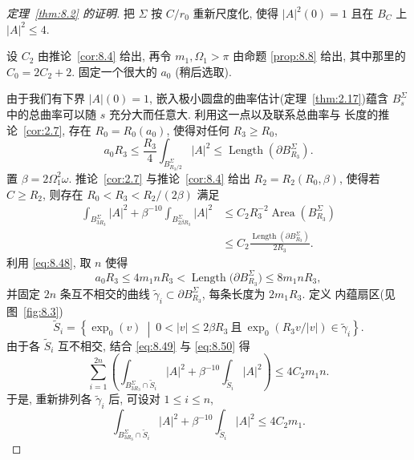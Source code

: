 \begin{proof}[定理~\ref{thm:8.2} 的证明]
把 $\Sigma$ 按 $C/r_0$ 重新尺度化, 使得 $|A|^2(0)=1$ 且在 $B_C$ 上
$|A|^2\leq4$.

设 $C_2$ 由推论~\ref{cor:8.4} 给出, 再令 $m_1,\Omega_1>\pi$ 由命题
\ref{prop:8.8} 给出, 其中那里的 $C_0=2C_2+2$. 固定一个很大的 $a_0$
(稍后选取).

由于我们有下界 $|A|(0)=1$, 嵌入极小圆盘的曲率估计(定理~\ref{thm:2.17})蕴含
$B_s^\Sigma$ 中的总曲率可以随 $s$ 充分大而任意大. 利用这一点以及联系总曲率与
长度的推论~\ref{cor:2.7}, 存在 $R_0=R_0(a_0)$, 使得对任何 $R_3\geq R_0$,
\begin{equation}
a_0R_3\leq\frac{R_3}{4}\int_{B_{R_3/2}^\Sigma}|A|^2
\leq\operatorname{Length}(\partial B_{R_3}^\Sigma).
\label{eq:8.48}
\end{equation}
置 $\beta=2\Omega_1^2\omega$. 推论~\ref{cor:2.7} 与推论~\ref{cor:8.4} 给出
$R_2=R_2(R_0,\beta)$, 使得若 $C\geq R_2$, 则存在
$R_0<R_3<R_2/(2\beta)$ 满足
\begin{equation}
\begin{aligned}
\int_{B_{3R_3}^\Sigma}|A|^2
+\beta^{-10}\int_{B_{2\beta R_3}^\Sigma}|A|^2
&\leq C_2R_3^{-2}\operatorname{Area}(B_{R_3}^\Sigma)\\
&\leq C_2\frac{\operatorname{Length}(\partial B_{R_3}^\Sigma)}{2R_3}.
\end{aligned}
\label{eq:8.49}
\end{equation}
利用 \eqref{eq:8.48}, 取 $n$ 使得
\begin{equation}
a_0R_3\leq4m_1nR_3
<\operatorname{Length}\bigl(\partial B_{R_3}^\Sigma\bigr)
\leq8m_1nR_3,
\label{eq:8.50}
\end{equation}
并固定 $2n$ 条互不相交的曲线
$\tilde\gamma_i\subset\partial B_{R_3}^\Sigma$, 每条长度为 $2m_1R_3$. 定义
内蕴扇区(见图~\ref{fig:8.3})
\begin{equation}
\tilde S_i=\left\{\exp_0(v)\ \middle|\ 0<|v|\leq2\beta R_3
\ \text{且}\ \exp_0(R_3v/|v|)\in\tilde\gamma_i\right\}.
\label{eq:8.51}
\end{equation}
由于各 $\tilde S_i$ 互不相交, 结合 \eqref{eq:8.49} 与 \eqref{eq:8.50} 得
\begin{equation}
\sum_{i=1}^{2n}\left(
 \int_{B_{3R_3}^\Sigma\cap\tilde S_i}|A|^2
 +\beta^{-10}\int_{\tilde S_i}|A|^2\right)\leq4C_2m_1n.
\label{eq:8.52}
\end{equation}
于是, 重新排列各 $\tilde\gamma_i$ 后, 可设对 $1\leq i\leq n$,
\begin{equation}
\int_{B_{3R_3}^\Sigma\cap\tilde S_i}|A|^2
+\beta^{-10}\int_{\tilde S_i}|A|^2\leq4C_2m_1.

\end{equation}
\end{proof}
